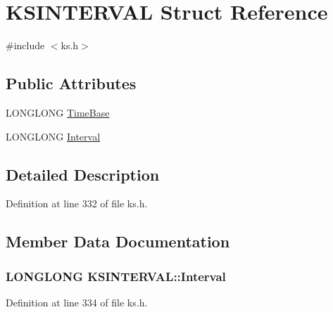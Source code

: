 \hypertarget{struct_k_s_i_n_t_e_r_v_a_l}{}\section{K\+S\+I\+N\+T\+E\+R\+V\+AL Struct Reference}
\label{struct_k_s_i_n_t_e_r_v_a_l}


{\ttfamily \#include $<$ks.\+h$>$}

\subsection*{Public Attributes}
\begin{DoxyCompactItemize}
\item 
L\+O\+N\+G\+L\+O\+NG \hyperlink{struct_k_s_i_n_t_e_r_v_a_l_a890f5ef2967056afb2a30db80b87e4e2}{Time\+Base}
\item 
L\+O\+N\+G\+L\+O\+NG \hyperlink{struct_k_s_i_n_t_e_r_v_a_l_aa5e6d780b5d8cbf63c7092ef0130c27f}{Interval}
\end{DoxyCompactItemize}


\subsection{Detailed Description}


Definition at line 332 of file ks.\+h.



\subsection{Member Data Documentation}
\subsubsection[{\texorpdfstring{Interval}{Interval}}]{\setlength{\rightskip}{0pt plus 5cm}L\+O\+N\+G\+L\+O\+NG K\+S\+I\+N\+T\+E\+R\+V\+A\+L\+::\+Interval}\hypertarget{struct_k_s_i_n_t_e_r_v_a_l_aa5e6d780b5d8cbf63c7092ef0130c27f}{}\label{struct_k_s_i_n_t_e_r_v_a_l_aa5e6d780b5d8cbf63c7092ef0130c27f}


Definition at line 334 of file ks.\+h.

